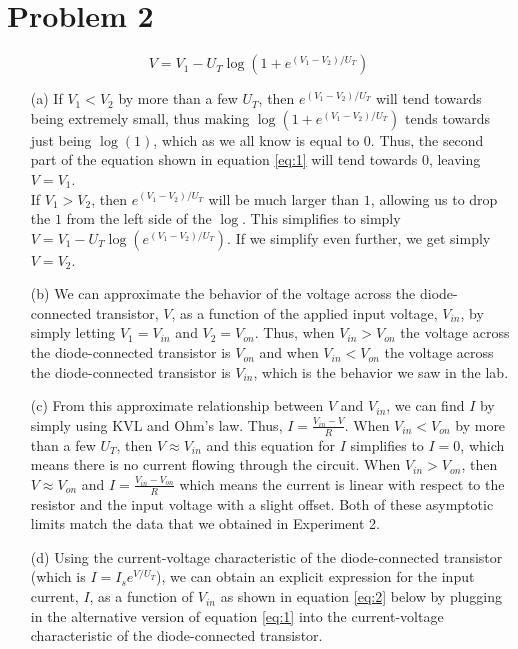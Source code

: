 \documentclass{article}
\begin{document}
\section{Problem 2}
\begin{equation} \label{eq:1}
    V = V_1 - U_T\log(1 + e^{(V_1-V_2)/U_T})
\end{equation}

\begin{itemize}
    \item [(a)] If $V_1 < V_2$ by more than a few $U_T$, then $e^{(V_1-V_2)/U_T}$ will tend towards being extremely small, thus making $\log{(1 + e^{(V_1-V_2)/U_T})}$ tends towards just being $\log{(1)}$, which as we all know is equal to $0$. Thus, the second part of the equation shown in equation \ref{eq:1} will tend towards $0$, leaving $V = V_1$. \\

        If $V_1 > V_2$, then $e^{(V_1-V_2)/U_T}$ will be much larger than $1$, allowing us to drop the $1$ from the left side of the $\log$. This simplifies to simply $V = V_1 - U_T\log(e^{(V_1-V_2)/U_T})$. If we simplify even further, we get simply $V = V_2$.

    \item [(b)] We can approximate the behavior of the voltage across the diode-connected transistor, $V$, as a function of the applied input voltage, $V_{in}$, by simply letting $V_1 = V_{in}$ and $V_2 = V_{on}$. Thus, when $V_{in} > V_{on}$ the voltage across the diode-connected transistor is $V_{on}$ and when $V_{in} < V_{on}$ the voltage across the diode-connected transistor is $V_{in}$, which is the behavior we saw in the lab.

    \item [(c)] From this approximate relationship between $V$ and $V_{in}$, we can find $I$ by simply using KVL and Ohm's law. Thus, $I = \frac{V_{in} - V}{R}$. When $V_{in} < V_{on}$ by more than a few $U_T$, then $V \approx V_{in}$ and this equation for $I$ simplifies to $I = 0$, which means there is no current flowing through the circuit. When $V_{in} > V_{on}$, then $V \approx V_{on}$ and $I = \frac{V_{in} - V_{on}}{R}$ which means the current is linear with respect to the resistor and the input voltage with a slight offset. Both of these asymptotic limits match the data that we obtained in Experiment 2.


    \item [(d)] Using the current-voltage characteristic of the diode-connected transistor (which is $I = I_se^{V/U_T}$), we can obtain an explicit expression for the input current, $I$, as a function of $V_{in}$ as shown in equation \ref{eq:2} below by plugging in the alternative version of equation \ref{eq:1} into the current-voltage characteristic of the diode-connected transistor. \\
        

\end{itemize}
\end{document}
